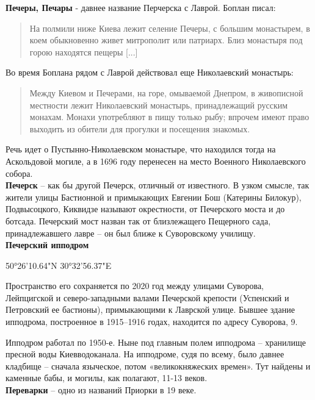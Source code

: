 
\textbf{Печеры, Печары} - давнее название Перчерска с Лаврой. Боплан писал:

\begin{quotation}На полмили ниже Киева лежит селение Печеры,  с большим монастырем, в коем обыкновенно живет митрополит или патриарх. Близ монастыря под горою находятся пещеры [...]
\end{quotation}

Во время Боплана рядом с Лаврой действовал еще Николаевский монастырь:

\begin{quotation}
Между Киевом и Печерами, на горе, омываемой Днепром, в живописной местности лежит Николаевский монастырь, принадлежащий русским монахам. Монахи употребляют в пищу только рыбу; впрочем имеют право выходить из обители для прогулки и посещения знакомых.
\end{quotation}

Речь идет о Пустынно-Николаевском монастыре, что находился тогда на Аскольдовой могиле, а в 1696 году перенесен на место Военного Николаевского собора.\\

\textbf{Печерск} – как бы другой Печерск, отличный от известного. В узком смысле, так жители улицы Бастионной и примыкающих Евгении Бош (Катерины Билокур), Подвысоцкого, Киквидзе называют окрестности, от Печерского моста и до ботсада. Печерский мост назван так от близлежащего Пещерного сада, принадлежавшего лавре – он был ближе к Суворовскому училищу.\\ 

\textbf{Печерский ипподром}

50°26'10.64"N 30°32'56.37"E

Пространство его сохраняется по 2020 год между улицами Суворова, Лейпцигской и северо-западными валами Печерской крепости (Успенский и Петровский ее бастионы), примыкающими к Лаврской улице. Бывшее здание ипподрома, построенное в 1915–1916 годах, находится по адресу Суворова, 9.

Ипподром работал по 1950-е. Ныне под главным полем ипподрома – хранилище пресной воды Киевводоканала. На ипподроме, судя по всему, было давнее кладбище – сначала языческое, потом «великокняжеских времен». Тут найдены и каменные бабы, и могилы, как полагают, 11-13 веков.\\

\textbf{Переварки} – одно из названий Приорки в 19 веке.\\

